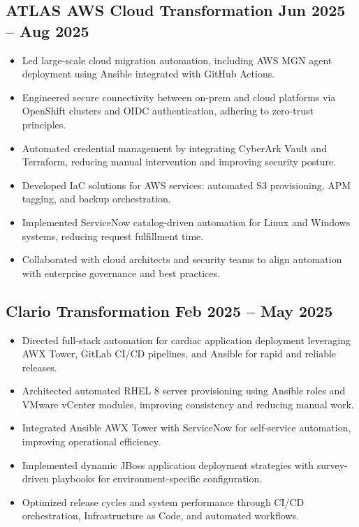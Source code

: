\documentclass[a4paper,10pt]{article}
\begin{document}
\subsection*{ATLAS AWS Cloud Transformation \hfill Jun 2025 -- Aug 2025}
\begin{itemize}
    \item Led large-scale cloud migration automation, including AWS MGN agent deployment using Ansible integrated with GitHub Actions.
    \item Engineered secure connectivity between on-prem and cloud platforms via OpenShift clusters and OIDC authentication, adhering to zero-trust principles.
    \item Automated credential management by integrating CyberArk Vault and Terraform, reducing manual intervention and improving security posture.
    \item Developed IaC solutions for AWS services: automated S3 provisioning, APM tagging, and backup orchestration.
    \item Implemented ServiceNow catalog-driven automation for Linux and Windows systems, reducing request fulfillment time.
    \item Collaborated with cloud architects and security teams to align automation with enterprise governance and best practices.
\end{itemize}

\subsection*{Clario Transformation \hfill Feb 2025 -- May 2025}
\begin{itemize}
    \item Directed full-stack automation for cardiac application deployment leveraging AWX Tower, GitLab CI/CD pipelines, and Ansible for rapid and reliable releases.
    \item Architected automated RHEL 8 server provisioning using Ansible roles and VMware vCenter modules, improving consistency and reducing manual work.
    \item Integrated Ansible AWX Tower with ServiceNow for self-service automation, improving operational efficiency.
    \item Implemented dynamic JBoss application deployment strategies with survey-driven playbooks for environment-specific configuration.
    \item Optimized release cycles and system performance through CI/CD orchestration, Infrastructure as Code, and automated workflows.
\end{itemize}
\end{document}
